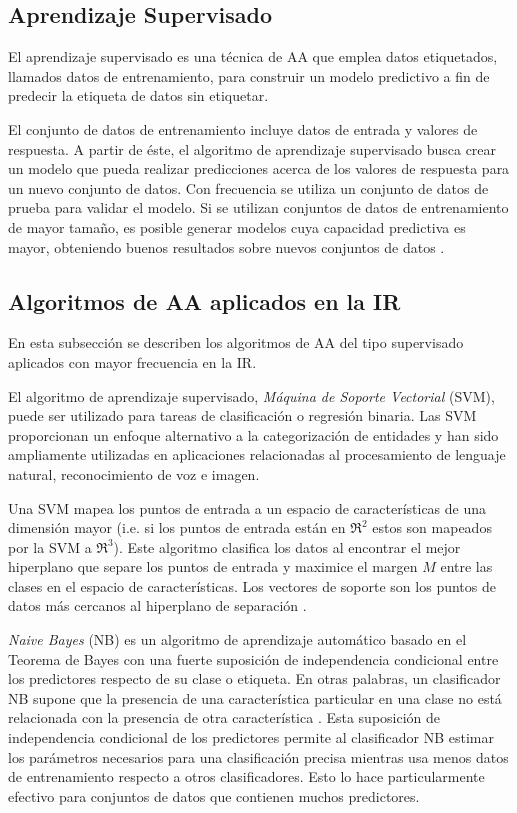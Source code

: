 \documentclass[journal]{IEEEtran}
\begin{document}
\subsection{Aprendizaje Supervisado}

El aprendizaje supervisado es una técnica de AA que emplea datos etiquetados, llamados datos de entrenamiento, para construir un modelo predictivo a fin de predecir la etiqueta de datos sin etiquetar.

El conjunto de datos de entrenamiento incluye datos de entrada y valores de respuesta. A partir de éste, el algoritmo de aprendizaje supervisado busca crear un modelo que pueda realizar predicciones acerca de los valores de respuesta para un nuevo conjunto de datos. Con frecuencia se utiliza un conjunto de datos de prueba para validar el modelo. Si se utilizan conjuntos de datos de entrenamiento de mayor tamaño, es posible generar modelos cuya capacidad predictiva es mayor, obteniendo buenos resultados sobre nuevos conjuntos de datos \cite{Darnstadt2014}.

\subsection{Algoritmos de AA aplicados en la IR}

En esta subsección se describen los algoritmos de AA del tipo supervisado aplicados con mayor frecuencia en la IR. 

El algoritmo de aprendizaje supervisado, \textit{Máquina de Soporte Vectorial} (SVM), puede ser utilizado para tareas de clasificación o regresión binaria. Las SVM proporcionan un enfoque alternativo a la categorización de entidades y han sido ampliamente utilizadas en aplicaciones relacionadas al procesamiento de lenguaje natural, reconocimiento de voz e imagen.

Una SVM mapea los puntos de entrada a un espacio de características de una dimensión mayor (i.e. si los puntos de entrada están en \(ℜ^2\) estos son mapeados por la SVM a \(ℜ^3\)). Este algoritmo clasifica los datos al encontrar el mejor hiperplano que separe los puntos de entrada y maximice el margen \( M \) entre las clases en el espacio de características.  Los vectores de soporte son los puntos de datos más cercanos al hiperplano de separación \cite{shawe2000support}.

\textit{Naive Bayes} (NB) es un algoritmo de aprendizaje automático basado en el Teorema de Bayes con una fuerte suposición de independencia condicional entre los predictores respecto de su clase o etiqueta. En otras palabras, un clasificador NB supone que la presencia de una característica particular en una clase no está relacionada con la presencia de otra característica \cite{manning2010introduction}. Esta suposición de independencia condicional de los predictores permite al clasificador NB estimar los parámetros necesarios para una clasificación precisa mientras usa menos datos de entrenamiento respecto a otros clasificadores. Esto lo hace particularmente efectivo para conjuntos de datos que contienen muchos predictores. 
\end{document}
